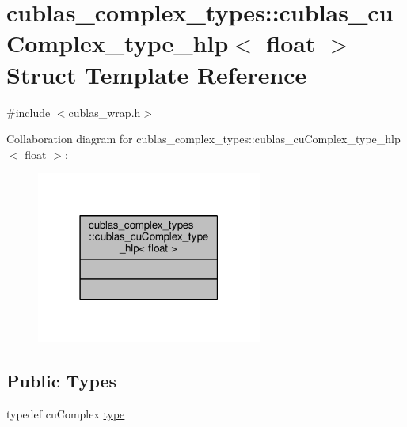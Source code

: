 \hypertarget{structcublas__complex__types_1_1cublas__cuComplex__type__hlp_3_01float_01_4}{\section{cublas\-\_\-complex\-\_\-types\-:\-:cublas\-\_\-cu\-Complex\-\_\-type\-\_\-hlp$<$ float $>$ Struct Template Reference}
\label{structcublas__complex__types_1_1cublas__cuComplex__type__hlp_3_01float_01_4}
}


{\ttfamily \#include $<$cublas\-\_\-wrap.\-h$>$}



Collaboration diagram for cublas\-\_\-complex\-\_\-types\-:\-:cublas\-\_\-cu\-Complex\-\_\-type\-\_\-hlp$<$ float $>$\-:\nopagebreak
\begin{figure}[H]
\begin{center}
\leavevmode
\includegraphics[width=210pt]{structcublas__complex__types_1_1cublas__cuComplex__type__hlp_3_01float_01_4__coll__graph}
\end{center}
\end{figure}
\subsection*{Public Types}
\begin{DoxyCompactItemize}
\item 
typedef cu\-Complex \hyperlink{structcublas__complex__types_1_1cublas__cuComplex__type__hlp_3_01float_01_4_add4b8ecc2b817f1dc6df9ba43ec67c03}{type}
\end{DoxyCompactItemize}


